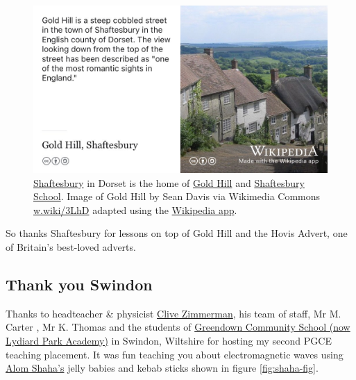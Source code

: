 \documentclass[
]{book}
\begin{document}
\begin{figure}

{\centering \includegraphics[width=1\linewidth]{images/shaftesbury} 

}

\caption{\href{https://en.wikipedia.org/wiki/Shaftesbury}{Shaftesbury} in Dorset is the home of \href{https://en.wikipedia.org/wiki/Gold_Hill,_Shaftesbury}{Gold Hill} and \href{https://en.wikipedia.org/wiki/Shaftesbury_School}{Shaftesbury School}. Image of Gold Hill by Sean Davis via Wikimedia Commons \href{https://w.wiki/3LhD}{w.wiki/3LhD} adapted using the \href{https://apps.apple.com/us/app/wikipedia/id324715238}{Wikipedia app}.}\label{fig:shaft-fig}
\end{figure}



So thanks Shaftesbury for lessons on top of Gold Hill and the Hovis Advert, one of Britain's best-loved adverts. \citep{hovisadvert} 🍞

\hypertarget{swindon}{%
\subsection{Thank you Swindon}\label{swindon}}

Thanks to headteacher \& physicist \href{https://www.swindonadvertiser.co.uk/news/14113118.lydiard-school-looking-to-help-others-improve-gcse-results/}{Clive Zimmerman}, his team of staff, Mr M. Carter , Mr K. Thomas and the students of \href{https://en.wikipedia.org/wiki/Lydiard_Park_Academy}{Greendown Community School (now Lydiard Park Academy)} in Swindon, Wiltshire for hosting my second PGCE teaching placement. It was fun teaching you about electromagnetic waves using \href{https://twitter.com/alomshaha}{Alom Shaha's} jelly babies and kebab sticks shown in figure \ref{fig:shaha-fig}.
\end{document}
